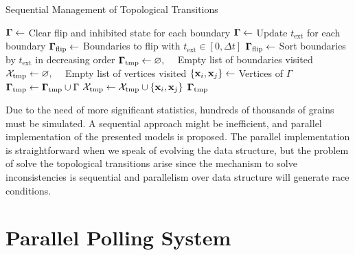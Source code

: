 \begin{algorithm}
\caption{Sequential Management of Topological Transitions}
\label{alg:seqtopological}
\begin{algorithmic}[1]
\State $\bm{\Gamma} \gets$ Clear flip and inhibited state for each boundary
\State $\bm{\Gamma} \gets$ Update $t_{\text{ext}}$ for each boundary
\State $\bm{\Gamma}_{\text{flip}} \gets$ Boundaries to flip with $t_{\text{ext}} \in [0, \Delta t]$ 
\State $\bm{\Gamma}_{\text{flip}} \gets$ Sort boundaries by $t_{\text{ext}}$ in decreasing order
\State $\bm{\Gamma}_{\text{tmp}} \gets \varnothing,\quad$ Empty list of boundaries visited
\State $\mathcal{X}_{\text{tmp}} \gets \varnothing,\quad$ Empty list of vertices visited
    \State $\{\x_i, \x_j\} \gets $ Vertices of $\Gamma$
        \State $\bm{\Gamma}_{\text{tmp}} \gets \bm{\Gamma}_{\text{tmp}} \cup \Gamma$
        \State $\vertices_{\text{tmp}} \gets \vertices_{\text{tmp}} \cup \{\x_i, \x_j\}$
    \Else
        \State \Return $\bm{\Gamma}_{\text{tmp}}$
    \EndIf
\EndFor
\EndProcedure
\end{algorithmic}
\end{algorithm}

Due to the need of more significant statistics, hundreds of thousands of grains must be simulated. A sequential approach might be inefficient, and parallel implementation of the presented models is proposed. The parallel implementation is straightforward when we speak of evolving the data structure, but the problem of solve the topological transitions arise since the mechanism to solve inconsistencies is sequential and parallelism over data structure will generate race conditions.

\section{Parallel Polling System}

